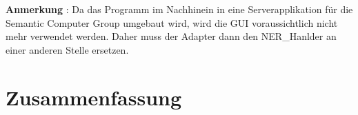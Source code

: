 \documentclass[11pt, a4paper, oneside]{Thesis} %
\begin{document}
\textbf{Anmerkung} : Da das Programm im Nachhinein in eine Serverapplikation f\"ur die Semantic Computer Group umgebaut wird, wird die GUI voraussichtlich nicht mehr verwendet werden. Daher muss der Adapter dann den NER\_Hanlder an einer anderen Stelle ersetzen.

\chapter{Zusammenfassung}



\makeglossaries
{}

\printglossary


\appendix %






\backmatter
\end{document}
